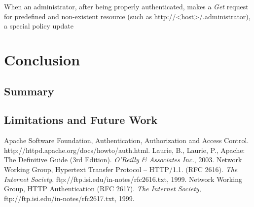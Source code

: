 \documentclass{llncs}
\begin{document}
        When an administrator, after being properly authenticated, makes a
        {\em Get} request for predefined and non-existent resource (such as
        http://<host>/.administrator), a special policy update 
        



  \section{Conclusion}

    \subsection{Summary}

    \subsection{Limitations and Future Work}

  \begin{thebibliography}{5}
      Apache Software Foundation,
      Authentication, Authorization and Access Control.
      http://httpd.apache.org/docs/howto/auth.html.
      Laurie, B., Laurie, P.,
      Apache: The Definitive Guide (3rd Edition).
      {\em O'Reilly \& Associates Inc.}, 2003.
      Network Working Group,
      Hypertext Transfer Protocol -- HTTP/1.1. (RFC 2616).
      {\em The Internet Society},
      ftp://ftp.isi.edu/in-notes/rfc2616.txt, 1999.
      Network Working Group,
      HTTP Authentication (RFC 2617).
      {\em The Internet Society},
      ftp://ftp.isi.edu/in-notes/rfc2617.txt, 1999.
  \end{thebibliography}
\end{document}

